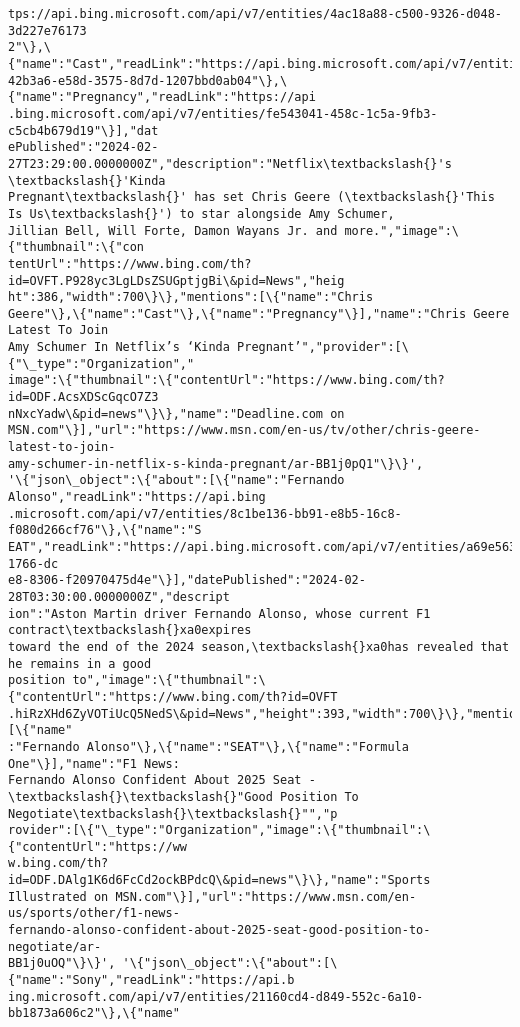 \documentclass[11pt]{article}
\begin{document}
\begin{Verbatim}[commandchars=\\\{\}]
tps://api.bing.microsoft.com/api/v7/entities/4ac18a88-c500-9326-d048-3d227e76173
2"\},\{"name":"Cast","readLink":"https://api.bing.microsoft.com/api/v7/entities/05
42b3a6-e58d-3575-8d7d-1207bbd0ab04"\},\{"name":"Pregnancy","readLink":"https://api
.bing.microsoft.com/api/v7/entities/fe543041-458c-1c5a-9fb3-c5cb4b679d19"\}],"dat
ePublished":"2024-02-27T23:29:00.0000000Z","description":"Netflix\textbackslash{}'s \textbackslash{}'Kinda
Pregnant\textbackslash{}' has set Chris Geere (\textbackslash{}'This Is Us\textbackslash{}') to star alongside Amy Schumer,
Jillian Bell, Will Forte, Damon Wayans Jr. and more.","image":\{"thumbnail":\{"con
tentUrl":"https://www.bing.com/th?id=OVFT.P928yc3LgLDsZSUGptjgBi\&pid=News","heig
ht":386,"width":700\}\},"mentions":[\{"name":"Chris
Geere"\},\{"name":"Cast"\},\{"name":"Pregnancy"\}],"name":"Chris Geere Latest To Join
Amy Schumer In Netflix’s ‘Kinda Pregnant’","provider":[\{"\_type":"Organization","
image":\{"thumbnail":\{"contentUrl":"https://www.bing.com/th?id=ODF.AcsXDScGqcO7Z3
nNxcYadw\&pid=news"\}\},"name":"Deadline.com on
MSN.com"\}],"url":"https://www.msn.com/en-us/tv/other/chris-geere-latest-to-join-
amy-schumer-in-netflix-s-kinda-pregnant/ar-BB1j0pQ1"\}\}',
'\{"json\_object":\{"about":[\{"name":"Fernando Alonso","readLink":"https://api.bing
.microsoft.com/api/v7/entities/8c1be136-bb91-e8b5-16c8-f080d266cf76"\},\{"name":"S
EAT","readLink":"https://api.bing.microsoft.com/api/v7/entities/a69e5633-1766-dc
e8-8306-f20970475d4e"\}],"datePublished":"2024-02-28T03:30:00.0000000Z","descript
ion":"Aston Martin driver Fernando Alonso, whose current F1 contract\textbackslash{}xa0expires
toward the end of the 2024 season,\textbackslash{}xa0has revealed that he remains in a good
position to","image":\{"thumbnail":\{"contentUrl":"https://www.bing.com/th?id=OVFT
.hiRzXHd6ZyVOTiUcQ5NedS\&pid=News","height":393,"width":700\}\},"mentions":[\{"name"
:"Fernando Alonso"\},\{"name":"SEAT"\},\{"name":"Formula One"\}],"name":"F1 News:
Fernando Alonso Confident About 2025 Seat - \textbackslash{}\textbackslash{}"Good Position To Negotiate\textbackslash{}\textbackslash{}"","p
rovider":[\{"\_type":"Organization","image":\{"thumbnail":\{"contentUrl":"https://ww
w.bing.com/th?id=ODF.DAlg1K6d6FcCd2ockBPdcQ\&pid=news"\}\},"name":"Sports
Illustrated on MSN.com"\}],"url":"https://www.msn.com/en-us/sports/other/f1-news-
fernando-alonso-confident-about-2025-seat-good-position-to-negotiate/ar-
BB1j0uOQ"\}\}', '\{"json\_object":\{"about":[\{"name":"Sony","readLink":"https://api.b
ing.microsoft.com/api/v7/entities/21160cd4-d849-552c-6a10-bb1873a606c2"\},\{"name"

\end{Verbatim}
\end{document}
